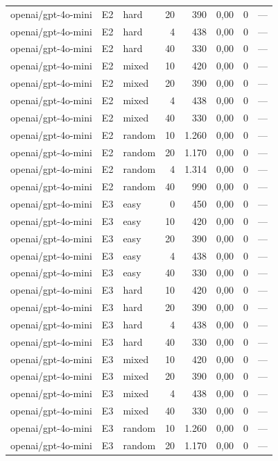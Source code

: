 \begin{table}[htbp]
\begin{tabular}{lllrrrrr}
openai/gpt-4o-mini & E2 & hard & 20 & 390 & 0,00 & 0 & — \\
openai/gpt-4o-mini & E2 & hard & 4 & 438 & 0,00 & 0 & — \\
openai/gpt-4o-mini & E2 & hard & 40 & 330 & 0,00 & 0 & — \\
openai/gpt-4o-mini & E2 & mixed & 10 & 420 & 0,00 & 0 & — \\
openai/gpt-4o-mini & E2 & mixed & 20 & 390 & 0,00 & 0 & — \\
openai/gpt-4o-mini & E2 & mixed & 4 & 438 & 0,00 & 0 & — \\
openai/gpt-4o-mini & E2 & mixed & 40 & 330 & 0,00 & 0 & — \\
openai/gpt-4o-mini & E2 & random & 10 & 1.260 & 0,00 & 0 & — \\
openai/gpt-4o-mini & E2 & random & 20 & 1.170 & 0,00 & 0 & — \\
openai/gpt-4o-mini & E2 & random & 4 & 1.314 & 0,00 & 0 & — \\
openai/gpt-4o-mini & E2 & random & 40 & 990 & 0,00 & 0 & — \\
openai/gpt-4o-mini & E3 & easy & 0 & 450 & 0,00 & 0 & — \\
openai/gpt-4o-mini & E3 & easy & 10 & 420 & 0,00 & 0 & — \\
openai/gpt-4o-mini & E3 & easy & 20 & 390 & 0,00 & 0 & — \\
openai/gpt-4o-mini & E3 & easy & 4 & 438 & 0,00 & 0 & — \\
openai/gpt-4o-mini & E3 & easy & 40 & 330 & 0,00 & 0 & — \\
openai/gpt-4o-mini & E3 & hard & 10 & 420 & 0,00 & 0 & — \\
openai/gpt-4o-mini & E3 & hard & 20 & 390 & 0,00 & 0 & — \\
openai/gpt-4o-mini & E3 & hard & 4 & 438 & 0,00 & 0 & — \\
openai/gpt-4o-mini & E3 & hard & 40 & 330 & 0,00 & 0 & — \\
openai/gpt-4o-mini & E3 & mixed & 10 & 420 & 0,00 & 0 & — \\
openai/gpt-4o-mini & E3 & mixed & 20 & 390 & 0,00 & 0 & — \\
openai/gpt-4o-mini & E3 & mixed & 4 & 438 & 0,00 & 0 & — \\
openai/gpt-4o-mini & E3 & mixed & 40 & 330 & 0,00 & 0 & — \\
openai/gpt-4o-mini & E3 & random & 10 & 1.260 & 0,00 & 0 & — \\
openai/gpt-4o-mini & E3 & random & 20 & 1.170 & 0,00 & 0 & — \\

\end{tabular}
\end{table}
